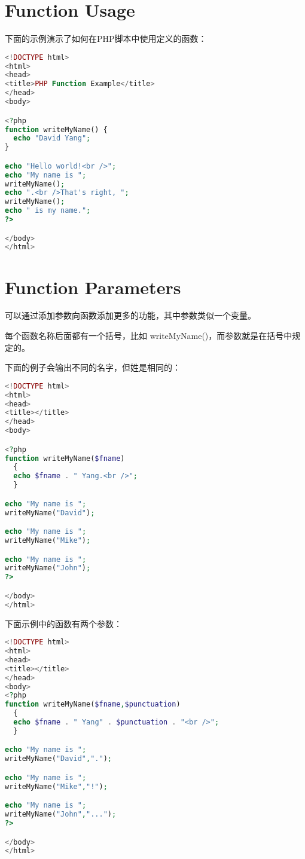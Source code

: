 \section{Function Usage}


下面的示例演示了如何在PHP脚本中使用定义的函数：


\begin{lstlisting}[language=PHP]
<!DOCTYPE html>
<html>
<head>
<title>PHP Function Example</title>
</head>
<body>

<?php
function writeMyName() {
  echo "David Yang";
}

echo "Hello world!<br />";
echo "My name is ";
writeMyName();
echo ".<br />That's right, ";
writeMyName();
echo " is my name.";
?>

</body>
</html>
\end{lstlisting}


\section{Function Parameters}

可以通过添加参数向函数添加更多的功能，其中参数类似一个变量。

每个函数名称后面都有一个括号，比如 writeMyName()，而参数就是在括号中规定的。

下面的例子会输出不同的名字，但姓是相同的：


\begin{lstlisting}[language=PHP]
<!DOCTYPE html>
<html>
<head>
<title></title>
</head>
<body>

<?php
function writeMyName($fname)
  {
  echo $fname . " Yang.<br />";
  }

echo "My name is ";
writeMyName("David");

echo "My name is ";
writeMyName("Mike");

echo "My name is ";
writeMyName("John");
?>

</body>
</html>
\end{lstlisting}

下面示例中的函数有两个参数：

\begin{lstlisting}[language=PHP]
<!DOCTYPE html>
<html>
<head>
<title></title>
</head>
<body>
<?php
function writeMyName($fname,$punctuation)
  {
  echo $fname . " Yang" . $punctuation . "<br />";
  }

echo "My name is ";
writeMyName("David",".");

echo "My name is ";
writeMyName("Mike","!");

echo "My name is ";
writeMyName("John","...");
?>

</body>
</html>
\end{lstlisting}



